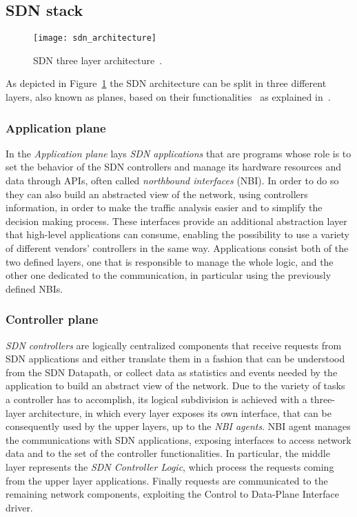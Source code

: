 \subsection{SDN stack}
\begin{figure}[ht]
 \centering
 \texttt{[image: sdn\_architecture]}
 \caption[SDN three layer architecture]{SDN three layer
          architecture~\cite{fundation2013software}.}
 \label{chap:background:img:sdn_architecture}
\end{figure}
As depicted in Figure~\ref{chap:background:img:sdn_architecture} the SDN
architecture can be split in three different layers, also known as planes,
based on their functionalities~\cite{fundation2012software} as explained
in~\cite{fundation2013software}.

\subsubsection{Application plane}

In the \emph{Application plane} lays \emph{SDN applications} that are programs
whose role is to set the behavior of the SDN controllers 
and manage its hardware resources and data through APIs, often called 
\emph{northbound interfaces} (NBI). In order to do so they can also build an
abstracted view of the network, using controllers information, in order to make
the traffic analysis easier and to simplify the decision making process.
These interfaces provide an additional abstraction layer that high-level 
applications can consume, enabling the possibility to use a variety of 
different vendors' controllers in the same way. Applications consist both of
the two defined layers, one that is responsible to manage the whole logic, and
the other one dedicated to the communication, in particular using the previously
defined NBIs.

\subsubsection{Controller plane}

\emph{SDN controllers} are logically centralized components that
receive requests from SDN applications and either translate them 
in a fashion that can be understood from the SDN Datapath, or collect 
data as statistics and events needed by the application to build an abstract
view of the network.  Due to the variety of tasks a controller has to
accomplish, its logical subdivision is achieved with a three-layer architecture,
in which every layer exposes its own interface, that can be consequently used by
the upper layers, up to the \emph{NBI agents}.
NBI agent manages the communications with SDN applications, exposing interfaces
to access network data and to the set of the controller functionalities.
In particular, the middle layer represents the \emph{SDN Controller Logic},
which process the requests coming from the upper layer applications. Finally
requests are communicated to the remaining network components, exploiting the
Control to Data-Plane Interface driver.

